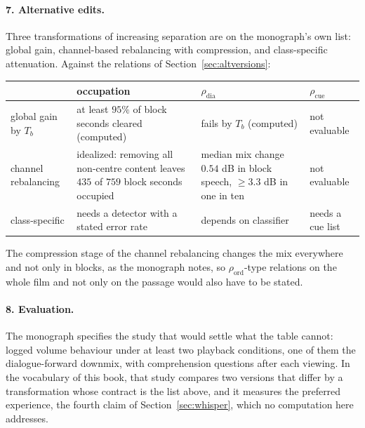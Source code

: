 \paragraph{7. Alternative edits.} Three transformations of increasing separation are on the monograph's own list: global gain, channel-based rebalancing with compression, and class-specific attenuation. Against the relations of Section~\ref{sec:altversions}:
\begin{center}
\small
\begin{tabular}{p{3.2cm}p{3.1cm}p{3.1cm}p{2.4cm}}
\toprule
 & occupation & $\rho_{\mathrm{dia}}$ & $\rho_{\mathrm{cue}}$\\
\midrule
global gain by $T_b$ & at least $95\%$ of block seconds cleared (computed) & fails by $T_b$ (computed) & not evaluable\\
channel rebalancing & idealized: removing all non-centre content leaves $435$ of $759$ block seconds occupied & median mix change $0.54$ dB in block speech, $\ge3.3$ dB in one in ten & not evaluable\\
class-specific & needs a detector with a stated error rate & depends on classifier & needs a cue list\\
\bottomrule
\end{tabular}
\end{center}
The compression stage of the channel rebalancing changes the mix everywhere and not only in blocks, as the monograph notes, so $\rho_{\mathrm{ord}}$-type relations on the whole film and not only on the passage would also have to be stated.

\paragraph{8. Evaluation.} The monograph specifies the study that would settle what the table cannot: logged volume behaviour under at least two playback conditions, one of them the dialogue-forward downmix, with comprehension questions after each viewing. In the vocabulary of this book, that study compares two versions that differ by a transformation whose contract is the list above, and it measures the preferred experience, the fourth claim of Section~\ref{sec:whisper}, which no computation here addresses.

